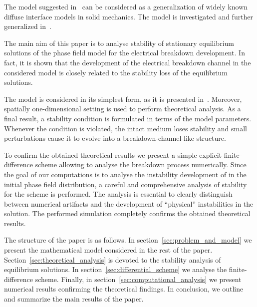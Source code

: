 The model suggested
in~\cite{pitike_dielectric_breakdown}
can be considered as a generalization of widely known diffuse
interface models in solid mechanics.
The model is investigated and further generalized in~\cite{zipunova_higher_codimension, zipunova_conservative,
zipunova_thermomechanical}.

The main aim of this paper is to analyse stability of
stationary equilibrium solutions of the phase field model for the
electrical breakdown development.
In fact, it is shown that the development of the electrical breakdown channel
in the considered model is closely related to the stability loss of
the equilibrium solutions.

The model is considered in its simplest form, as it is presented
in~\cite{pitike_dielectric_breakdown}.
Moreover, spatially one-dimensional setting is used to perform
theoretical analysis. As a final result, a stability condition is
formulated in terms of the model parameters. Whenever the condition is
violated, the intact medium loses stability and small perturbations
cause it to evolve into a breakdown-channel-like structure.

To confirm the obtained theoretical results we present a simple explicit
finite-difference scheme allowing to analyse the breakdown process
numerically. Since the goal of our computations is to analyse the instability
development of in the initial phase field distribution,
a careful and comprehensive analysis of stability for the scheme is
performed. The analysis is essential to clearly distinguish between numerical
artifacts and the development of ``physical'' instabilities in the solution.
The performed simulation completely confirms the obtained theoretical
results.

The structure of the paper is as follows.
In section~\ref{sec:problem_and_model} we present the mathematical model
considered in the rest of the paper. Section~\ref{sec:theoretical_analysis} is
devoted to the stability analysis of equilibrium solutions. In
section~\ref{sec:differential_scheme} we analyse the finite-difference scheme. Finally, in
section~\ref{sec:computational_analysis} we present numerical results confirming the
theoretical findings. In conclusion, we outline and summarize the main results of the paper.

\endinput

